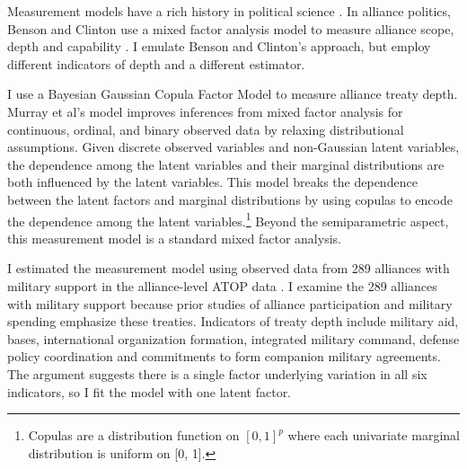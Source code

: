 \documentclass[12pt]{article}
\begin{document}
Measurement models have a rich history in political science \citep{Clintonetal2004, TreierJackman2008, Fariss2014}.
In alliance politics, Benson and Clinton use a mixed factor analysis model to measure alliance scope, depth and capability \citep{BensonClinton2016, Quinn2004}.  
I emulate Benson and Clinton's approach, but employ different indicators of depth and a different estimator. 


I use a Bayesian Gaussian Copula Factor Model \citep{Murrayetal2013} to measure alliance treaty depth. 
Murray et al's model improves inferences from mixed factor analysis for continuous, ordinal, and binary observed data by relaxing distributional assumptions. 
Given discrete observed variables and non-Gaussian latent variables, the dependence among the latent variables and their marginal distributions are both influenced by the latent variables.
This model breaks the dependence between the latent factors and marginal distributions by using copulas to encode the dependence among the latent variables.\footnote{Copulas are a distribution function on $[0, 1]^p$ where each univariate marginal distribution is uniform on [0, 1].}
Beyond the semiparametric aspect, this measurement model is a standard mixed factor analysis.


I estimated the measurement model using observed data from 289 alliances with military support in the alliance-level ATOP data \citep{Leedsetal2002}. 
I examine the 289 alliances with military support because prior studies of alliance participation and military spending emphasize these treaties.
Indicators of treaty depth include military aid, bases, international organization formation, integrated military command, defense policy coordination and commitments to form companion military agreements. 
The argument suggests there is a single factor underlying variation in all six indicators, so I fit the model with one latent factor. 
\end{document}
